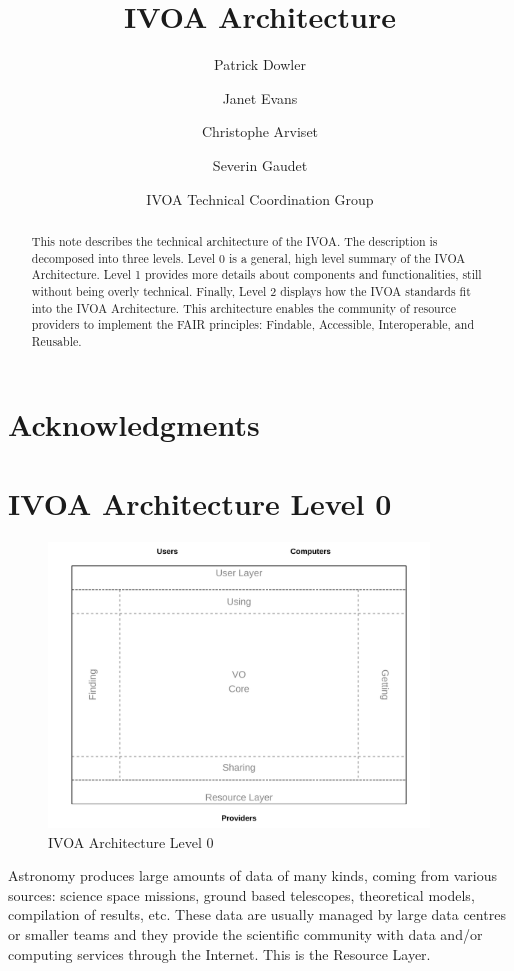\documentclass[11pt,a4paper]{ivoa}
\title{IVOA Architecture}
\author{Patrick Dowler}
\author{Janet Evans}
\author{Christophe Arviset}
\author{Severin Gaudet}
\author{IVOA Technical Coordination Group}
\begin{document}
\begin{abstract}
This note describes the technical architecture of the IVOA. The description is decomposed 
into three levels. Level 0 is a general, high level summary of the IVOA Architecture. 
Level 1 provides more details about components and functionalities, still without 
being overly technical. Finally, Level 2 displays how the IVOA standards fit into 
the IVOA Architecture. This architecture enables the community of resource providers to
implement the FAIR principles: Findable, Accessible, Interoperable, and Reusable.
\end{abstract}

\section*{Acknowledgments}

\section{IVOA Architecture Level 0}

\begin{figure}[h]
\centering
\includegraphics[width=0.9\textwidth]{archdiag0.pdf}
\caption{IVOA Architecture Level 0}
\label{fig:architecture0}
\end{figure}

Astronomy produces large amounts of data of many kinds, coming from various sources: 
science  space missions, ground based telescopes, theoretical models, compilation of 
results, etc.  These data are usually managed by large data centres or smaller teams
and they provide  the scientific community with data and/or computing services 
through the Internet. This is the Resource Layer. 
\end{document}
